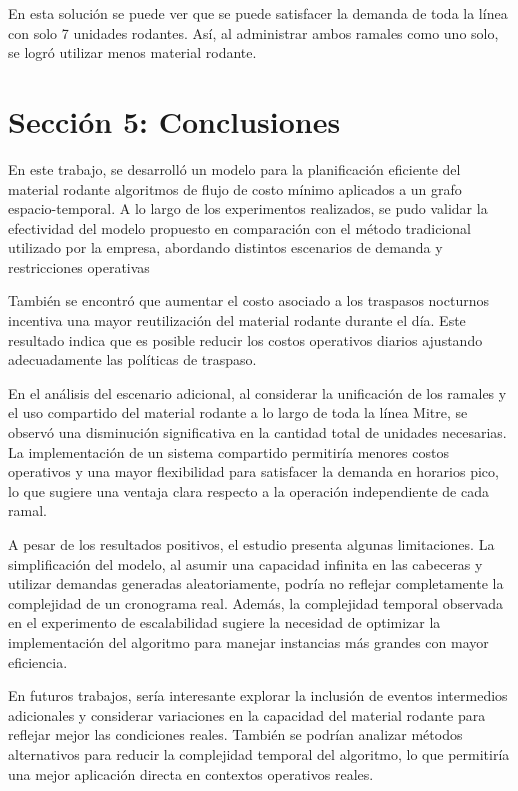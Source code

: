 \documentclass{article}
\begin{document}
En esta solución se puede ver que se puede satisfacer la demanda de toda la línea con solo 7 unidades rodantes. Así, al administrar ambos ramales como uno solo, se logró utilizar menos material rodante.

\section*{Sección 5: Conclusiones}
En este trabajo, se desarrolló un modelo para la planificación eficiente del material rodante algoritmos de flujo de costo mínimo aplicados a un grafo espacio-temporal. A lo largo de los experimentos realizados, se pudo validar la efectividad del modelo propuesto en comparación con el método tradicional utilizado por la empresa, abordando distintos escenarios de demanda y restricciones operativas

También se encontró que aumentar el costo asociado a los traspasos nocturnos incentiva una mayor reutilización del material rodante durante el día. Este resultado indica que es posible reducir los costos operativos diarios ajustando adecuadamente las políticas de traspaso.

En el análisis del escenario adicional, al considerar la unificación de los ramales y el uso compartido del material rodante a lo largo de toda la línea Mitre, se observó una disminución significativa en la cantidad total de unidades necesarias. La implementación de un sistema compartido permitiría menores costos operativos y una mayor flexibilidad para satisfacer la demanda en horarios pico, lo que sugiere una ventaja clara respecto a la operación independiente de cada ramal.

A pesar de los resultados positivos, el estudio presenta algunas limitaciones. La simplificación del modelo, al asumir una capacidad infinita en las cabeceras y utilizar demandas generadas aleatoriamente, podría no reflejar completamente la complejidad de un cronograma real. Además, la complejidad temporal observada en el experimento de escalabilidad sugiere la necesidad de optimizar la implementación del algoritmo para manejar instancias más grandes con mayor eficiencia.

En futuros trabajos, sería interesante explorar la inclusión de eventos intermedios adicionales y considerar variaciones en la capacidad del material rodante para reflejar mejor las condiciones reales. También se podrían analizar métodos alternativos para reducir la complejidad temporal del algoritmo, lo que permitiría una mejor aplicación directa en contextos operativos reales.

\printbibliography
\end{document}
